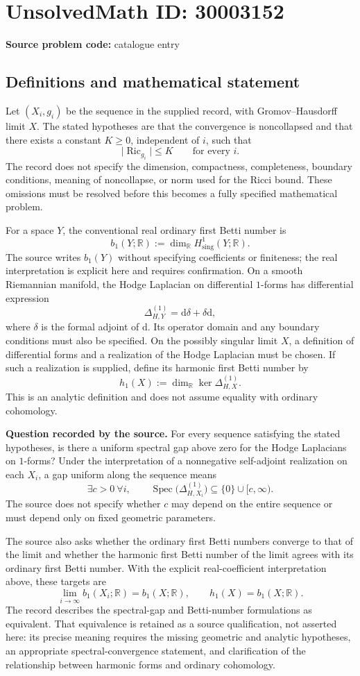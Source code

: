 \documentclass[11pt]{article}
\newcommand{\R}{\mathbb{R}}
\begin{document}
\section*{UnsolvedMath ID: 30003152}
\textbf{Source problem code:} catalogue entry
\subsection{Definitions and mathematical statement}
Let \((X_i,g_i)\) be the sequence in the supplied record, with Gromov--Hausdorff limit \(X\). The stated hypotheses are that the convergence is noncollapsed and that there exists a constant \(K\geq 0\), independent of \(i\), such that
\[
\lvert\operatorname{Ric}_{g_i}\rvert\leq K\qquad\text{for every }i.
\]
The record does not specify the dimension, compactness, completeness, boundary conditions, meaning of noncollapse, or norm used for the Ricci bound. These omissions must be resolved before this becomes a fully specified mathematical problem.

For a space \(Y\), the conventional real ordinary first Betti number is
\[
b_1(Y;\R):=\dim_{\R}H^1_{\mathrm{sing}}(Y;\R).
\]
The source writes \(b_1(Y)\) without specifying coefficients or finiteness; the real interpretation is explicit here and requires confirmation. On a smooth Riemannian manifold, the Hodge Laplacian on differential \(1\)-forms has differential expression
\[
\Delta_{H,Y}^{(1)}=\mathrm d\delta+\delta\mathrm d,
\]
where \(\delta\) is the formal adjoint of \(\mathrm d\). Its operator domain and any boundary conditions must also be specified. On the possibly singular limit \(X\), a definition of differential forms and a realization of the Hodge Laplacian must be chosen. If such a realization is supplied, define its harmonic first Betti number by
\[
h_1(X):=\dim_{\R}\ker\Delta_{H,X}^{(1)}.
\]
This is an analytic definition and does not assume equality with ordinary cohomology.

\textbf{Question recorded by the source.} For every sequence satisfying the stated hypotheses, is there a uniform spectral gap above zero for the Hodge Laplacians on \(1\)-forms? Under the interpretation of a nonnegative self-adjoint realization on each \(X_i\), a gap uniform along the sequence means
\[
\exists c>0\ \forall i,\qquad
\operatorname{Spec}\bigl(\Delta_{H,X_i}^{(1)}\bigr)
\subseteq\{0\}\cup[c,\infty).
\]
The source does not specify whether \(c\) may depend on the entire sequence or must depend only on fixed geometric parameters.

The source also asks whether the ordinary first Betti numbers converge to that of the limit and whether the harmonic first Betti number of the limit agrees with its ordinary first Betti number. With the explicit real-coefficient interpretation above, these targets are
\[
\lim_{i\to\infty}b_1(X_i;\R)=b_1(X;\R),
\qquad
h_1(X)=b_1(X;\R).
\]
The record describes the spectral-gap and Betti-number formulations as equivalent. That equivalence is retained as a source qualification, not asserted here: its precise meaning requires the missing geometric and analytic hypotheses, an appropriate spectral-convergence statement, and clarification of the relationship between harmonic forms and ordinary cohomology.
\end{document}
